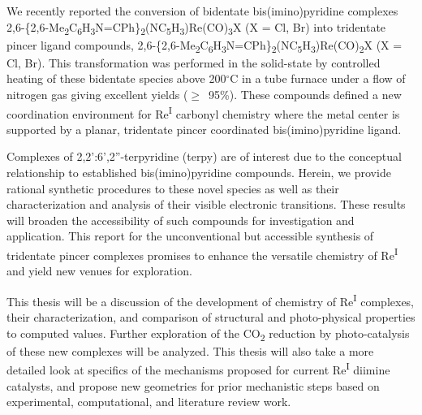 We recently reported the conversion of bidentate bis(imino)pyridine complexes 2,6-\{2,6-Me\textsubscript{2}C\textsubscript{6}H\textsubscript{3}N=CPh\}\textsubscript{2}(NC\textsubscript{5}H\textsubscript{3})Re(CO)\textsubscript{3}X  (X = Cl, Br) into tridentate pincer ligand compounds, 2,6-\{2,6-Me\textsubscript{2}C\textsubscript{6}H\textsubscript{3}N=CPh\}\textsubscript{2}(NC\textsubscript{5}H\textsubscript{3})Re(CO)\textsubscript{2}X (X = Cl, Br)\autocite{jurca2013}. This transformation was performed in the solid-state by controlled heating of these bidentate species above 200$^\circ$C in a tube furnace under a flow of nitrogen gas giving excellent yields ($\geq$~95\%). These compounds defined a new coordination environment for Re\textsuperscript{I} carbonyl chemistry where the metal center is supported by a planar, tridentate pincer coordinated bis(imino)pyridine ligand. 

Complexes of 2,2':6',2''-terpyridine (terpy) are of interest due to the conceptual relationship to established bis(imino)pyridine compounds\autocite{russell2010, tondreau2012}. Herein, we provide rational synthetic procedures to these novel species as well as their characterization and analysis of their visible electronic transitions. These results will broaden the accessibility of such compounds for investigation and application. This report for the unconventional but accessible synthesis of tridentate pincer complexes promises to enhance the versatile chemistry of Re\textsuperscript{I} and yield new venues for exploration.

This thesis will be a discussion of the development of chemistry of Re\textsuperscript{I} complexes, their characterization, and comparison of structural and photo-physical properties to computed values. Further exploration of the CO\textsubscript{2} reduction by photo-catalysis of these new complexes will be analyzed. This thesis will also take a more detailed look at specifics of the mechanisms proposed for current Re\textsuperscript{I} diimine catalysts, and propose new geometries for prior mechanistic steps based on experimental, computational, and literature review work.

